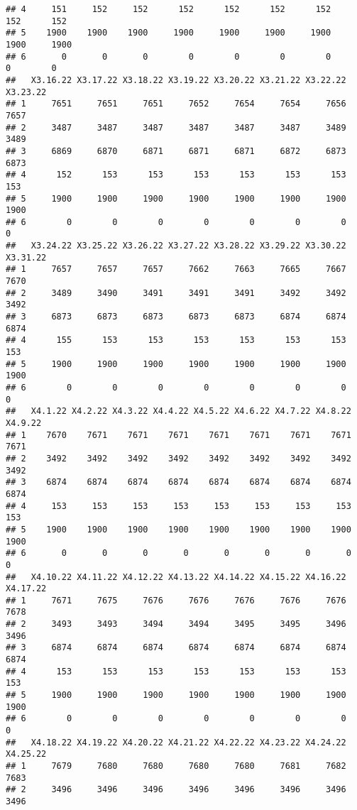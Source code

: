 \documentclass[
]{article}
\begin{document}
\begin{verbatim}
## 4     151     152     152      152      152      152      152      152      152
## 5    1900    1900    1900     1900     1900     1900     1900     1900     1900
## 6       0       0       0        0        0        0        0        0        0
##   X3.16.22 X3.17.22 X3.18.22 X3.19.22 X3.20.22 X3.21.22 X3.22.22 X3.23.22
## 1     7651     7651     7651     7652     7654     7654     7656     7657
## 2     3487     3487     3487     3487     3487     3487     3489     3489
## 3     6869     6870     6871     6871     6871     6872     6873     6873
## 4      152      153      153      153      153      153      153      153
## 5     1900     1900     1900     1900     1900     1900     1900     1900
## 6        0        0        0        0        0        0        0        0
##   X3.24.22 X3.25.22 X3.26.22 X3.27.22 X3.28.22 X3.29.22 X3.30.22 X3.31.22
## 1     7657     7657     7657     7662     7663     7665     7667     7670
## 2     3489     3490     3491     3491     3491     3492     3492     3492
## 3     6873     6873     6873     6873     6873     6874     6874     6874
## 4      155      153      153      153      153      153      153      153
## 5     1900     1900     1900     1900     1900     1900     1900     1900
## 6        0        0        0        0        0        0        0        0
##   X4.1.22 X4.2.22 X4.3.22 X4.4.22 X4.5.22 X4.6.22 X4.7.22 X4.8.22 X4.9.22
## 1    7670    7671    7671    7671    7671    7671    7671    7671    7671
## 2    3492    3492    3492    3492    3492    3492    3492    3492    3492
## 3    6874    6874    6874    6874    6874    6874    6874    6874    6874
## 4     153     153     153     153     153     153     153     153     153
## 5    1900    1900    1900    1900    1900    1900    1900    1900    1900
## 6       0       0       0       0       0       0       0       0       0
##   X4.10.22 X4.11.22 X4.12.22 X4.13.22 X4.14.22 X4.15.22 X4.16.22 X4.17.22
## 1     7671     7675     7676     7676     7676     7676     7676     7678
## 2     3493     3493     3494     3494     3495     3495     3496     3496
## 3     6874     6874     6874     6874     6874     6874     6874     6874
## 4      153      153      153      153      153      153      153      153
## 5     1900     1900     1900     1900     1900     1900     1900     1900
## 6        0        0        0        0        0        0        0        0
##   X4.18.22 X4.19.22 X4.20.22 X4.21.22 X4.22.22 X4.23.22 X4.24.22 X4.25.22
## 1     7679     7680     7680     7680     7680     7681     7682     7683
## 2     3496     3496     3496     3496     3496     3496     3496     3496

\end{verbatim}
\end{document}
